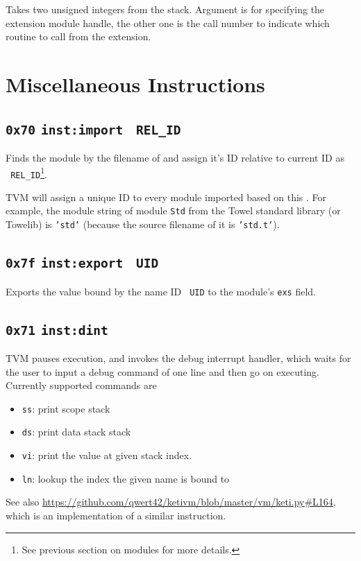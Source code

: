 \documentclass{report}
\newcommand{\mtilde}[1]{\textasciitilde}
\newcommand{\marg}[1]{\texttt{\mtilde ~#1}}
\newcommand{\inst}[1] {\texttt{inst:#1}}
\begin{document}
Takes two unsigned integers from the stack. Argument  is for specifying the extension module handle, the other one is the call number to indicate which routine to call from the extension.

\section{Miscellaneous Instructions}

\subsection{\texttt{0x70} \inst{import}  \marg{REL\_ID}}

Finds the module by the filename of  and assign it's ID relative to current ID as \marg{REL\_ID}\footnote{See previous section on modules for more details.}.

TVM will assign a unique ID to every module imported based on this . For example, the module string of module \texttt{Std} from the Towel standard library (or Towelib) is \texttt{'std'} (because the source filename of it is \texttt{'std.t'}).

\subsection{\texttt{0x7f} \inst{export} \marg{UID}}

Exports the value bound by the name ID \marg{UID} to the module's \texttt{exs} field.

\subsection{\texttt{0x71} \inst{dint}}

TVM pauses execution, and invokes the debug interrupt handler, which waits for the user to input a debug command of one line and then go on executing. Currently supported commands are
\begin{itemize}
\item \texttt{ss}: print scope stack
\item \texttt{ds}: print data stack stack
\item \texttt{vi}: print the value at given stack index.
\item \texttt{ln}: lookup the index the given name is bound to
\end{itemize}

See also \url{https://github.com/qwert42/ketivm/blob/master/vm/keti.py#L164}, which is an implementation of a similar instruction.
\end{document}
